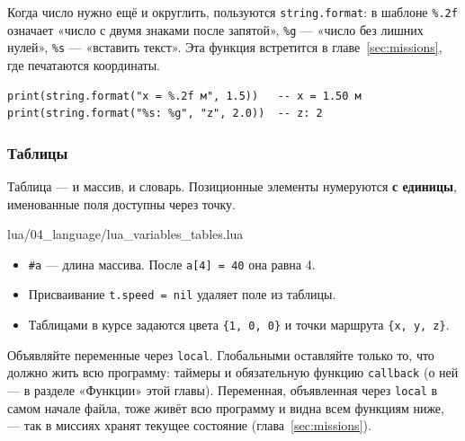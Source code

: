 Когда число нужно ещё и округлить, пользуются \verb|string.format|: в шаблоне \verb|%.2f| означает «число с двумя знаками после запятой», \verb|%g| --- «число без лишних нулей», \verb|%s| --- «вставить текст». Эта функция встретится в главе~\ref{sec:missions}, где печатаются координаты.

\begin{codebox}
\begin{verbatim}
print(string.format("x = %.2f м", 1.5))   -- x = 1.50 м
print(string.format("%s: %g", "z", 2.0))  -- z: 2
\end{verbatim}
\end{codebox}

\subsubsection*{Таблицы}

Таблица --- и массив, и словарь. Позиционные элементы нумеруются \textbf{с единицы}, именованные поля доступны через точку.

\begin{codefile}{lua/04_language/lua_variables_tables.lua}
\end{codefile}

\begin{itemize}
    \item \verb|#a| --- длина массива. После \verb|a[4] = 40| она равна 4.
    \item Присваивание \verb|t.speed = nil| удаляет поле из таблицы.
    \item Таблицами в курсе задаются цвета \verb|{1, 0, 0}| и точки маршрута \verb|{x, y, z}|.
\end{itemize}

\begin{rulebox}
Объявляйте переменные через \verb|local|. Глобальными оставляйте только то, что должно жить всю программу: таймеры и обязательную функцию \verb|callback| (о ней --- в разделе «Функции» этой главы). Переменная, объявленная через \verb|local| в самом начале файла, тоже живёт всю программу и видна всем функциям ниже, --- так в миссиях хранят текущее состояние (глава~\ref{sec:missions}).
\end{rulebox}

